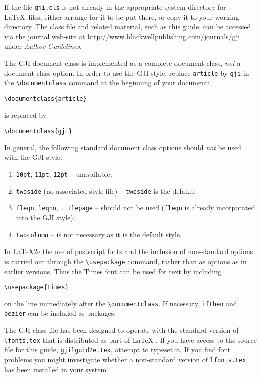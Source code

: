 \documentclass{gji}
\begin{document}
If the file \verb"gji.cls" is not already in the appropriate
system directory for \LaTeX\ files, either arrange for it to be
put there, or copy it to your working directory. The class file
and related material, such as this guide, can be accessed via the
journal web-site  at
http://www.blackwellpublishing.com/journals/gji under {\em Author
Guidelines}.

The GJI document class is implemented as a complete document class, {\em
not\/} a document class option. In   order to use the GJI style, replace
\verb"article" by
\verb"gji" in the
\verb"\documentclass" command at the beginning of your document:
\begin{verbatim}
\documentclass{article}
\end{verbatim}
is replaced by
\begin{verbatim}
\documentclass{gji}
\end{verbatim}
In general, the following standard document class options should {\em
not\/} be used with the GJI style:
\begin{enumerate}
  \item \texttt{10pt}, \texttt{11pt}, \texttt{12pt} -- unavailable;
  \item \texttt{twoside} (no associated style file) --
     \texttt{twoside} is the default;
  \item \texttt{fleqn}, \texttt{leqno}, \texttt{titlepage} --
        should not be used (\verb"fleqn" is already incorporated into
        the GJI style);
  \item \texttt{twocolumn} -- is not necessary as it is the default style.
\end{enumerate}

In \LaTeX2e the use of postscript fonts and the inclusion of non-standard
options is carried out through the \verb"\usepackage" command, rather than
as options as in earlier versions.  Thus the Times font can be used for
text by including
\begin{verbatim}
\usepackage{times}
\end{verbatim}
on the line immediately after the \verb"\documentclass". If necessary,
\texttt{ifthen} and \texttt{bezier} can be included as packages.

The GJI class file has been designed to operate with the standard
version of \verb"lfonts.tex" that is distributed as part of \LaTeX
. If you have access to the source file for this guide,
\verb"gjilguid2e.tex", attempt to typeset it.  If you find font
problems you might investigate whether a non-standard version of
\verb"lfonts.tex" has been installed in your system.
\end{document}
